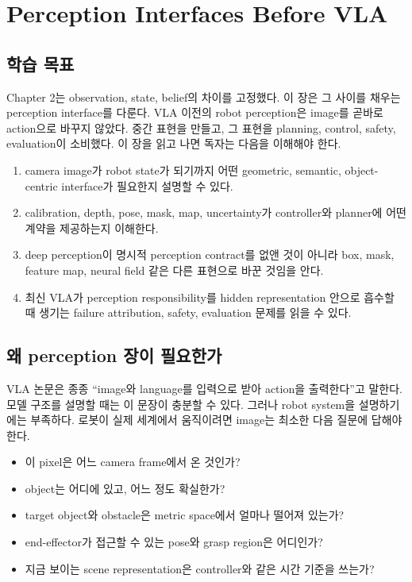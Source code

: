 \chapter{Perception Interfaces Before VLA}

\section*{학습 목표}
Chapter 2는 observation, state, belief의 차이를 고정했다. 이 장은 그 사이를 채우는 perception interface를 다룬다. VLA 이전의 robot perception은 image를 곧바로 action으로 바꾸지 않았다. 중간 표현을 만들고, 그 표현을 planning, control, safety, evaluation이 소비했다. 이 장을 읽고 나면 독자는 다음을 이해해야 한다.

\begin{enumerate}
  \item camera image가 robot state가 되기까지 어떤 geometric, semantic, object-centric interface가 필요한지 설명할 수 있다.
  \item calibration, depth, pose, mask, map, uncertainty가 controller와 planner에 어떤 계약을 제공하는지 이해한다.
  \item deep perception이 명시적 perception contract를 없앤 것이 아니라 box, mask, feature map, neural field 같은 다른 표현으로 바꾼 것임을 안다.
  \item 최신 VLA가 perception responsibility를 hidden representation 안으로 흡수할 때 생기는 failure attribution, safety, evaluation 문제를 읽을 수 있다.
\end{enumerate}

\section{왜 perception 장이 필요한가}

VLA 논문은 종종 ``image와 language를 입력으로 받아 action을 출력한다''고 말한다. 모델 구조를 설명할 때는 이 문장이 충분할 수 있다. 그러나 robot system을 설명하기에는 부족하다. 로봇이 실제 세계에서 움직이려면 image는 최소한 다음 질문에 답해야 한다.

\begin{itemize}
  \item 이 pixel은 어느 camera frame에서 온 것인가?
  \item object는 어디에 있고, 어느 정도 확실한가?
  \item target object와 obstacle은 metric space에서 얼마나 떨어져 있는가?
  \item end-effector가 접근할 수 있는 pose와 grasp region은 어디인가?
  \item 지금 보이는 scene representation은 controller와 같은 시간 기준을 쓰는가?
\end{itemize}

